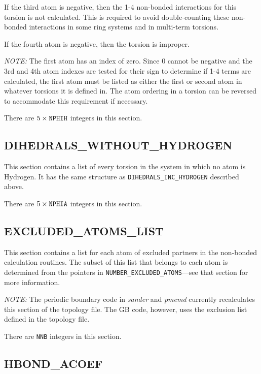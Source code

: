 If the third atom is negative, then the 1-4 non-bonded interactions for this
torsion is not calculated. This is required to avoid double-counting these
non-bonded interactions in some ring systems and in multi-term torsions.

If the fourth atom is negative, then the torsion is improper.

\emph{NOTE:} The first atom has an index of zero. Since 0 cannot be negative and
the 3rd and 4th atom indexes are tested for their sign to determine if 1-4 terms
are calculated, the first atom must be listed as either the first or second atom
in whatever torsions it is defined in. The atom ordering in a torsion can be
reversed to accommodate this requirement if necessary.


\noindent There are $5 \times {\tt NPHIH}$ integers in this section.

\subsection*{DIHEDRALS\_WITHOUT\_HYDROGEN}

This section contains a list of every torsion in the system in which no atom is
Hydrogen. It has the same structure as {\tt DIHEDRALS\_INC\_HYDROGEN} described
above.


\noindent There are $5 \times {\tt NPHIA}$ integers in this section.

\subsection*{EXCLUDED\_ATOMS\_LIST}

This section contains a list for each atom of excluded partners in the
non-bonded calculation routines. The subset of this list that belongs to each
atom is determined from the pointers in {\tt NUMBER\_EXCLUDED\_ATOMS}---see that
section for more information.

\emph{NOTE:} The periodic boundary code in \emph{sander} and \emph{pmemd}
currently recalculates this section of the topology file. The GB code, however,
uses the exclusion list defined in the topology file.


\noindent There are {\tt NNB} integers in this section.

\subsection*{HBOND\_ACOEF}

